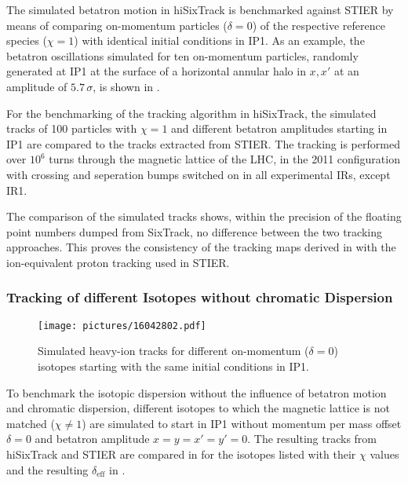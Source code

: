 The simulated betatron motion in hiSixTrack is benchmarked against STIER by means of comparing on-momentum particles ($\delta = 0$) of the respective reference species ($\chi=1$) with identical initial conditions in IP1. As an example, the betatron oscillations simulated for ten on-momentum particles, randomly generated at IP1 at the surface of a horizontal annular halo in $x,x'$ at an amplitude of $5.7\,\sigma$, is shown in . 

For the benchmarking of the tracking algorithm in hiSixTrack, the simulated tracks of 100 particles with $\chi=1$ and different betatron amplitudes starting in IP1 are compared to the tracks extracted from STIER. The tracking is performed over $10^6$ turns through the magnetic lattice of the LHC, in the 2011 configuration with crossing and seperation bumps switched on in all experimental IRs, except IR1. 

The comparison of the simulated tracks shows, within the precision of the floating point numbers dumped from SixTrack, no difference between the two tracking approaches. This proves the consistency of the tracking maps derived in  with the ion-equivalent proton tracking used in STIER.






\subsubsection{Tracking of different Isotopes without chromatic Dispersion}

  \begin{figure}[t]
  \centering
  \texttt{[image: pictures/16042802.pdf]}
  \caption{Simulated heavy-ion tracks for different on-momentum ($\delta=0$) isotopes starting with the same initial conditions in IP1.}  
  \label{pic:15080501}
  \end{figure}

To benchmark the isotopic dispersion without the influence of betatron motion and chromatic dispersion, different isotopes to which the magnetic lattice is not matched ($\chi\neq 1$) are simulated to start in IP1 without momentum per mass offset $\delta=0$ and betatron amplitude $x=y=x'=y'=0$. The resulting tracks from hiSixTrack and STIER are compared in  for the isotopes listed with their $\chi$ values and the resulting $\delta_\text{eff}$ in . 

